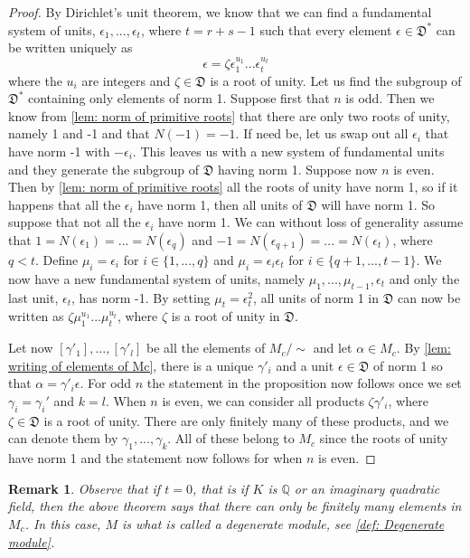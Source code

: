 \documentclass{article}
\newtheorem{remark}{Remark}[section]
\newcommand{\mfrak}[1]{\mathfrak{#1}}
\newcommand{\mbb}[1]{\mathbb{#1}}
\numberwithin{equation}{section}
\begin{document}
\begin{proof}
    By Dirichlet's unit theorem, we know that we can find a fundamental system of units, $\epsilon_1, ..., \epsilon_t$, where $t = r+s-1$ such that every element $\epsilon \in \mfrak D^*$ can be written uniquely as
    $$\epsilon = \zeta \epsilon_1^{u_1} ... \epsilon_t^{u_t}$$
    where the $u_i$ are integers and $\zeta \in \mfrak D$ is a root of unity. Let us find the subgroup of $\mfrak D^*$ containing only elements of norm 1. Suppose first that $n$ is odd. Then we know from \cref{lem: norm of primitive roots} that there are only two roots of unity, namely 1 and -1 and that $N(-1) = -1$. If need be, let us swap out all $\epsilon_i$ that have norm -1 with $-\epsilon_i$. This leaves us with a new system of fundamental units and they generate the subgroup of $\mfrak D$ having norm 1. Suppose now $n$ is even. Then by \cref{lem: norm of primitive roots} all the roots of unity have norm 1, so if it happens that all the $\epsilon_i$ have norm 1, then all units of $\mfrak D$ will have norm 1. So suppose that not all the $\epsilon_i$ have norm 1. We can without loss of generality assume that $1 = N(\epsilon_1) = ... = N(\epsilon_q)$ and $-1 = N(\epsilon_{q+1}) = ... = N(\epsilon_t)$, where $q < t$. Define
    $\mu_i = \epsilon_i$ for $i \in \{1, ..., q\}$ and $\mu_i = \epsilon_i \epsilon_t$ for $i \in \{q+1, ..., t-1\}$. We now have a new fundamental system of units, namely $\mu_1, ..., \mu_{t-1},\epsilon_t$ and only the last unit, $\epsilon_t$, has norm -1. By setting $\mu_t = \epsilon_t^2$, all units of norm 1 in $\mfrak D$ can now be written as $\zeta \mu_1^{u_1}...\mu_t^{u_t}$, where $\zeta$ is a root of unity in $\mfrak D$.

    Let now $[\gamma'_1], ..., [\gamma'_l]$ be all the elements of $M_c / \sim$ and let $\alpha \in M_c$. By \cref{lem: writing of elements of Mc}, there is a unique $\gamma'_i$ and a unit $\epsilon \in \mfrak D$ of norm 1 so that $\alpha = \gamma'_i \epsilon$. For odd $n$ the statement in the proposition now follows once we set $\gamma_i = \gamma_i'$ and $k = l$. When $n$ is even, we can consider all products $\zeta \gamma'_i$, where $\zeta \in \mfrak D$ is a root of unity. There are only finitely many of these products, and we can denote them by $\gamma_1, ..., \gamma_k$. All of these belong to $M_c$ since the roots of unity have norm 1 and the statement now follows for when $n$ is even.
\end{proof}
\begin{remark}\label{rem: When does a full module have finitely many solutions}
    Observe that if $t = 0$, that is if $K$ is $\mbb Q$ or an imaginary quadratic field, then the above theorem says that there can only be finitely many elements in $M_c$. In this case, $M$ is what is called a degenerate module, see \cref{def: Degenerate module}.
\end{remark}
\end{document}
